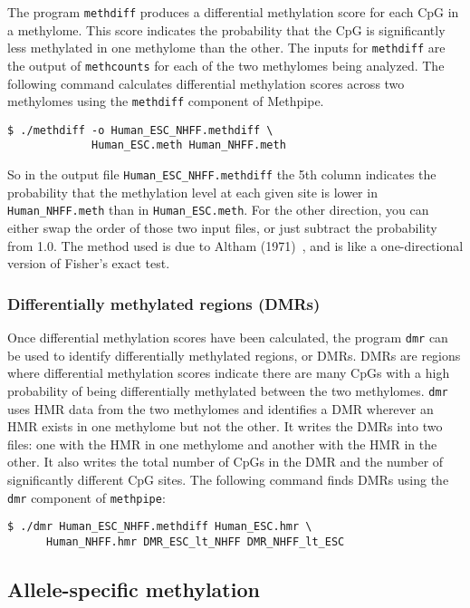 \documentclass[10pt]{article}
\newcommand{\meth}{\texttt{methpipe}}
\newcommand{\prog}[1]{\texttt{#1}}
\newcommand{\fn}[1]{\texttt{#1}}
\begin{document}
The program \prog{methdiff} produces a differential methylation score
for each CpG in a methylome. This score indicates the probability that
the CpG is significantly less methylated in one methylome than the
other. The inputs for \prog{methdiff} are the output of
\prog{methcounts} for each of the two methylomes being analyzed. The
following command calculates differential methylation scores across
two methylomes using the \prog{methdiff} component of Methpipe.
\begin{verbatim}
$ ./methdiff -o Human_ESC_NHFF.methdiff \
             Human_ESC.meth Human_NHFF.meth
\end{verbatim}
So in the output file \fn{Human\_ESC\_NHFF.methdiff} the 5th
column indicates the probability that the methylation level at each
given site is lower in \fn{Human\_NHFF.meth} than in
\fn{Human\_ESC.meth}. For the other direction, you can either
swap the order of those two input files, or just subtract the
probability from 1.0. The method used is due to Altham
(1971)~\cite{altham1971exact}, and is like a one-directional version
of Fisher's exact test.

\subsubsection{Differentially methylated regions (DMRs)}
\label{sec:dmr}

Once differential methylation scores have been calculated, the program
\prog{dmr} can be used to identify differentially methylated regions,
or DMRs. DMRs are regions where differential methylation scores
indicate there are many CpGs with a high probability of being
differentially methylated between the two methylomes.
\prog{dmr} uses HMR data from the two methylomes and identifies
a DMR wherever an HMR exists in one methylome but not the other.
It writes the DMRs into two files: one with the HMR in one methylome
and another with the HMR in the other.  It also writes the total number
of CpGs in the DMR and the number of significantly different CpG sites.
The following command finds DMRs using the \prog{dmr} component
of \meth{}:
\begin{verbatim}
$ ./dmr Human_ESC_NHFF.methdiff Human_ESC.hmr \
      Human_NHFF.hmr DMR_ESC_lt_NHFF DMR_NHFF_lt_ESC
\end{verbatim}

\subsection{Allele-specific methylation}
\end{document}
